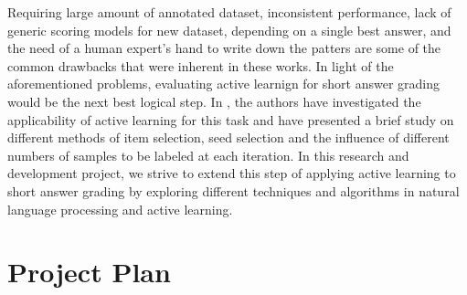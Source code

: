 \documentclass[rnd]{mas_proposal}
\begin{document}
\vspace{5mm}

Requiring large amount of annotated dataset, inconsistent performance, lack of generic scoring models for new dataset, depending on a single best answer, and the need of a human expert's hand to write down the patters are some of the common drawbacks that were inherent in these works. In light of the aforementioned problems, evaluating active learnign for short answer grading would be the next best logical step. In \cite{Horbach2016}, the authors have investigated the applicability of active learning for this task and have presented a brief study on different methods of item selection, seed selection and the influence of different numbers of samples to be labeled at each iteration. In this research and development project, we strive to extend this step of applying active learning to short answer grading by exploring different techniques and algorithms in natural language processing and active learning. 



\chapter{Project Plan}
\end{document}
